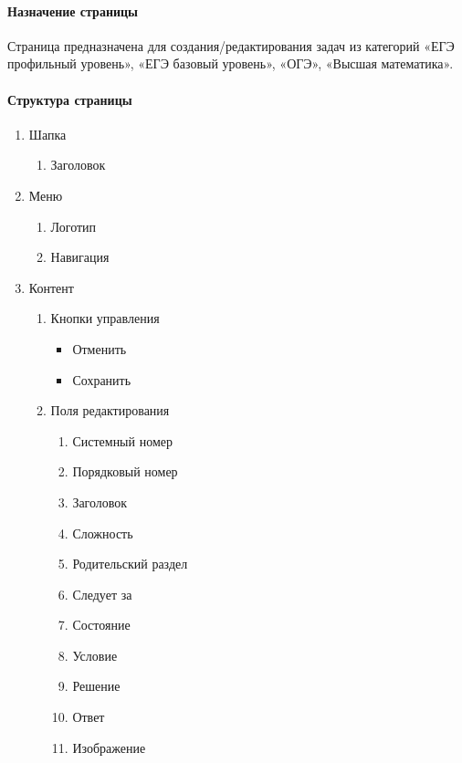 \paragraph{Назначение страницы}
Страница предназначена для создания/редактирования задач из категорий «ЕГЭ профильный уровень», «ЕГЭ базовый уровень», «ОГЭ», «Высшая математика».

\paragraph{Структура страницы}
\begin{enumerate}
	\item Шапка
	\begin{enumerate}
		\item Заголовок
	\end{enumerate}

	\item Меню
	\begin{enumerate}
		\item Логотип
		\item Навигация
	\end{enumerate}

	\item Контент
	\begin{enumerate}
		\item Кнопки управления
		\begin{itemize}
			\item Отменить
			\item Сохранить
		\end{itemize}

		\item Поля редактирования
		\begin{enumerate}
			\item Системный номер
			\item Порядковый номер
			\item Заголовок
			\item Сложность
			\item Родительский раздел
			\item Следует за
			\item Состояние
			\item Условие
			\item Решение
			\item Ответ
			\item Изображение
		\end{enumerate}
	\end{enumerate}
\end{enumerate}

